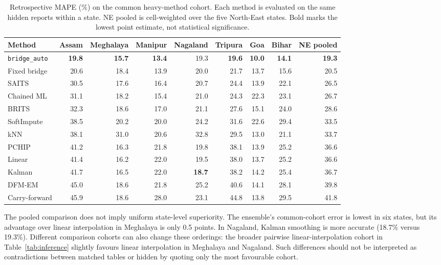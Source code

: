\documentclass[sigconf,nonacm,balance=false]{acmart}
\newcommand{\auto}{\texttt{bridge\_auto}}
\begin{document}
\begin{table}[tbp]
\caption{Retrospective MAPE (\%) on the common heavy-method cohort. Each method is evaluated on the same hidden reports within a state. NE pooled is cell-weighted over the five North-East states. Bold marks the lowest point estimate, not statistical significance.}
\label{tab:main}
\begin{tabular}{lrrrrrrrr}
\toprule
Method & Assam & Meghalaya & Manipur & Nagaland & Tripura & Goa & Bihar & NE pooled \\
\midrule
\auto{} & \textbf{19.8} & \textbf{15.7} & \textbf{13.4} & 19.3 & \textbf{19.6} & \textbf{10.0} & \textbf{14.1} & \textbf{19.3} \\
Fixed bridge & 20.6 & 18.4 & 13.9 & 20.0 & 21.7 & 13.7 & 15.6 & 20.5 \\
SAITS & 30.5 & 17.6 & 16.4 & 20.7 & 24.4 & 13.9 & 22.1 & 26.5 \\
Chained ML & 31.1 & 18.2 & 15.4 & 21.0 & 24.3 & 22.3 & 23.1 & 26.7 \\
BRITS & 32.3 & 18.6 & 17.0 & 21.1 & 27.6 & 15.1 & 24.0 & 28.6 \\
SoftImpute & 38.5 & 20.2 & 20.0 & 24.2 & 31.6 & 22.6 & 29.4 & 33.5 \\
kNN & 38.1 & 31.0 & 20.6 & 32.8 & 29.5 & 13.0 & 21.1 & 33.7 \\
PCHIP & 41.2 & 16.3 & 21.8 & 19.8 & 38.1 & 13.9 & 25.2 & 36.6 \\
Linear & 41.4 & 16.2 & 22.0 & 19.5 & 38.0 & 13.7 & 25.2 & 36.6 \\
Kalman & 41.7 & 16.5 & 22.0 & \textbf{18.7} & 38.2 & 14.2 & 25.4 & 36.7 \\
DFM-EM & 45.0 & 18.6 & 21.8 & 25.2 & 40.6 & 14.1 & 28.1 & 39.8 \\
Carry-forward & 45.9 & 18.6 & 28.0 & 23.1 & 44.8 & 13.8 & 29.5 & 41.8 \\
\bottomrule
\end{tabular}
\end{table}

The pooled comparison does not imply uniform state-level superiority. The ensemble's common-cohort error is lowest in six states, but its advantage over linear interpolation in Meghalaya is only 0.5 points. In Nagaland, Kalman smoothing is more accurate (18.7\% versus 19.3\%). Different comparison cohorts can also change these orderings: the broader pairwise linear-interpolation cohort in Table~\ref{tab:inference} slightly favours linear interpolation in Meghalaya and Nagaland. Such differences should not be interpreted as contradictions between matched tables or hidden by quoting only the most favourable cohort.
\end{document}
